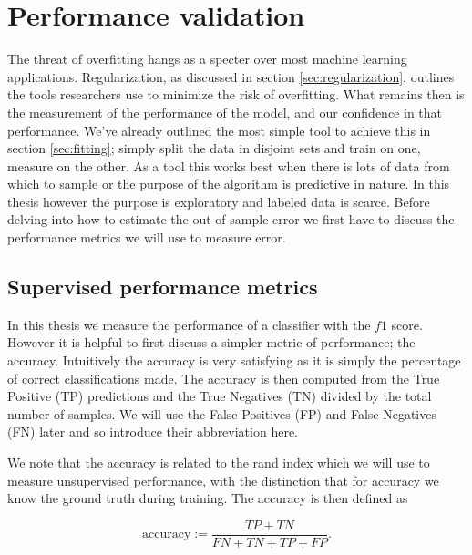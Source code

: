 \section{Performance validation}\label{sec:performance_val}

The threat of overfitting hangs as a specter over most machine learning applications. Regularization, as discussed in section \ref{sec:regularization}, outlines the tools researchers use to minimize the risk of overfitting. What remains then is the measurement of the performance of the model, and our confidence in that performance. We've already outlined the most simple tool to achieve this in section \ref{sec:fitting}; simply split the data in disjoint sets and train on one, measure on the other. As a tool this works best when there is lots of data from which to sample or the purpose of the algorithm is predictive in nature. In this thesis however the purpose is exploratory and labeled data is scarce. Before delving into how to estimate the out-of-sample error we first have to discuss the performance metrics we will use to measure error. 

\subsection{Supervised performance metrics}\label{sec:supervised_perf}

In this thesis we measure the performance of a classifier with the $f1$ score. However it is helpful to first discuss a simpler metric of performance; the accuracy. Intuitively the accuracy is very satisfying as it is simply the percentage of correct classifications made. The accuracy is then computed from the True Positive (TP) predictions and the True Negatives (TN) divided by the total number of samples. We will use the False Positives (FP) and False Negatives (FN) later and so introduce their abbreviation here.

We note that the accuracy is related to the rand index which we will use to measure unsupervised performance, with the distinction that for accuracy we know the ground truth during training. The accuracy is then defined as 

\begin{equation}\label{eq:accuracy}
\text{accuracy} := \frac{TP + TN}{FN+ TN + TP+FP}.
\end{equation}

